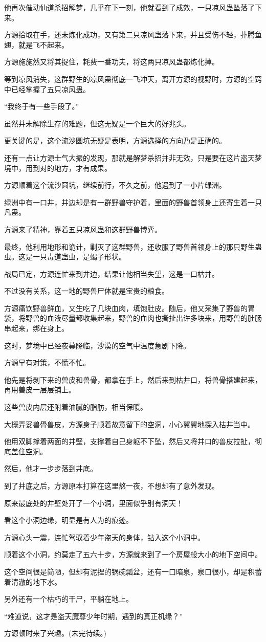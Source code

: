 \begin{this_body}
他再次催动仙道杀招解梦，几乎在下一刻，他就看到了成效，一只凉风蛊坠落了下来。

方源拾取在手，还未炼化成功，又有第二只凉风蛊落下来，并且受伤不轻，扑腾鱼翅，就是飞不起来。

方源施施然又将其捉住，耗费一番功夫，将这两只凉风蛊都炼化掉。

等到凉风消失，这群野生的凉风蛊彻底一飞冲天，离开方源的视野时，方源的空窍中已经掌握了五只凉风蛊。

“我终于有一些手段了。”

虽然并未解除生存的难题，但这无疑是一个巨大的好兆头。

更关键的是，这个流沙圆坑无疑是表明，方源选择的方向乃是正确的。

还有一点让方源士气大振的发现，那就是解梦杀招并非无效，只是要在这片盗天梦境中，用到对的地方，才有成果。

方源顺着这个流沙圆坑，继续前行，不久之前，他遇到了一小片绿洲。

绿洲中有一口井，井边却是有一群野兽守护着，里面的野兽首领身上还寄生着一只凡蛊。

方源来了精神，靠着五只凉风蛊和这群野兽博弈。

最终，他利用地形和诡计，剿灭了这群野兽，还收服了野兽首领身上的那只野生蛊虫。这是一只毒道蛊虫，是蝎子形状。

战局已定，方源连忙来到井边，结果让他相当失望，这是一口枯井。

不过没有关系，这一地的野兽尸体就是宝贵的粮食。

方源痛饮野兽鲜血，又生吃了几块血肉，填饱肚皮。随后，他又采集了野兽的胃袋，将野兽的血液尽量都收集起来，野兽的血肉也撕扯出许多块来，用野兽的肚肠串起来，绑在身上。

这时，梦境中已经夜幕降临，沙漠的空气中温度急剧下降。

方源早有对策，不慌不忙。

他先是将剥下来的兽皮和兽骨，都拿在手上，然后来到枯井口，将兽骨搭建起来，再用兽皮一层层铺上。

这些兽皮内层还附着油腻的脂肪，相当保暖。

大概弄妥兽骨兽皮，方源身子顺着故意留下的空洞，小心翼翼地探入枯井当中。

他用双脚撑着两面的井壁，支撑着自己身躯不下坠，然后又将井口的兽皮拉扯，彻底盖住空洞。

然后，他才一步步落到井底。

到了井底之后，方源原本打算在这里熬一夜，不想却有了意外发现。

原来最底处的井壁处开了一个小洞，里面似乎别有洞天！

看这个小洞边缘，明显是有人为的痕迹。

方源心头一震，连忙驾驭着少年盗天的身体，钻入这个小洞中。

顺着这个小洞，约莫走了五六十步，方源就来到了一个房屋般大小的地下空间中。

这个空间很是简陋，但却有泥捏的锅碗瓢盆，还有一口暗泉，泉口很小，却是积蓄着清澈的地下水。

另外还有一个枯朽的干尸，平躺在地上。

“难道说，这才是盗天魔尊少年时期，遇到的真正机缘？”

方源顿时来了兴趣。(未完待续。)

\end{this_body}

